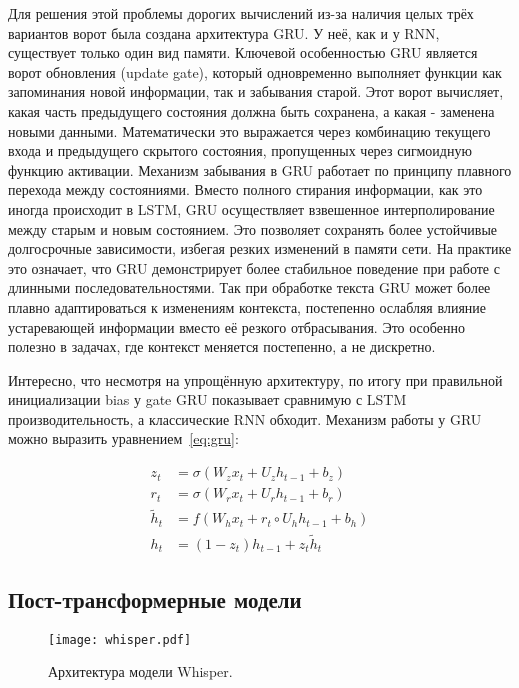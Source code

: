 Для решения этой проблемы дорогих вычислений из-за наличия целых трёх вариантов ворот была создана архитектура GRU.
У неё, как и у RNN, существует только один вид памяти.
Ключевой особенностью GRU является ворот обновления (update gate), который одновременно выполняет функции как запоминания новой информации, так и забывания старой.
Этот ворот вычисляет, какая часть предыдущего состояния должна быть сохранена, а какая - заменена новыми данными.
Математически это выражается через комбинацию текущего входа и предыдущего скрытого состояния, пропущенных через сигмоидную функцию активации.
Механизм забывания в GRU работает по принципу плавного перехода между состояниями. Вместо полного стирания информации, как это иногда происходит в LSTM, GRU осуществляет взвешенное интерполирование между старым и новым состоянием. Это позволяет сохранять более устойчивые долгосрочные зависимости, избегая резких изменений в памяти сети.
На практике это означает, что GRU демонстрирует более стабильное поведение при работе с длинными последовательностями.
Так при обработке текста GRU может более плавно адаптироваться к изменениям контекста, постепенно ослабляя влияние устаревающей информации вместо её резкого отбрасывания.
Это особенно полезно в задачах, где контекст меняется постепенно, а не дискретно.

Интересно, что несмотря на упрощённую архитектуру, по итогу при правильной инициализации bias у gate GRU показывает сравнимую с LSTM производительность, а классические RNN обходит.
Механизм работы у GRU можно выразить уравнением~\ref{eq:gru}:

\begin{equation}
  \begin{aligned}
    z_t &= \sigma(W_z x_t + U_z h_{t-1} + b_z) \\
    r_t &= \sigma(W_r x_t + U_r h_{t-1} + b_r) \\
    \tilde{h}_t &= f(W_h x_t + r_t \circ U_h h_{t-1} + b_h) \\
    h_t &= (1 - z_t) h_{t-1} + z_t \tilde{h}_t
  \end{aligned}
  \label{eq:gru}
\end{equation}

\subsection{Пост-трансформерные модели}

\begin{figure}[!t]
  \centering
  \texttt{[image: whisper.pdf]}
  \caption{Архитектура модели Whisper.}
  \label{fig:whisper}
\end{figure}

